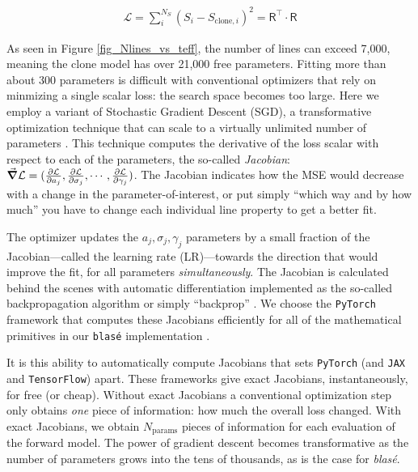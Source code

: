 \documentclass[twocolumn]{aastex631}
\begin{document}
\begin{eqnarray}
    \mathcal{L} = \sum_i^{N_S} (S_i - S_{\mathrm{clone},i})^2 = \mathsf{R^\intercal}\cdot \mathsf{R} \label{simpleLikelihood}
\end{eqnarray}


As seen in Figure \ref{fig_Nlines_vs_teff}, the number of lines can exceed 7,000, meaning the clone model has over 21,000 free parameters. Fitting more than about 300 parameters is difficult with conventional optimizers that rely on minmizing a single scalar loss: the search space becomes too large.  Here we employ a variant of Stochastic Gradient Descent (SGD), a transformative optimization technique that can scale to a virtually unlimited number of parameters \citep{2016arXiv160904747R}. This technique computes the derivative of the loss scalar with respect to each of the parameters, the so-called \emph{Jacobian}: $\grad \mathcal{L} = (\frac{\partial \mathcal{L}}{\partial a_j}, \frac{\partial \mathcal{L}}{\partial \sigma_j}, \cdots, \frac{\partial \mathcal{L}}{\partial \gamma_j})$. The Jacobian indicates how the MSE would decrease with a change in the parameter-of-interest, or put simply ``which way and by how much'' you have to change each individual line property to get a better fit.

The optimizer updates the $a_j, \sigma_j, \gamma_j$ parameters by a small fraction of the Jacobian---called the learning rate (LR)---towards the direction that would improve the fit, for all parameters \emph{simultaneously}. The Jacobian is calculated behind the scenes with automatic differentiation implemented as the so-called backpropagation algorithm or simply ``backprop'' \citep{2015arXiv150205767G}. We choose the \texttt{PyTorch} framework that computes these Jacobians efficiently for all of the mathematical primitives in our \texttt{blas\'e} implementation \citep{2019arXiv191201703P}.

It is this ability to automatically compute Jacobians that sets \texttt{PyTorch} (and \texttt{JAX} and \texttt{TensorFlow}) apart.  These frameworks give exact Jacobians, instantaneously, for free (or cheap).  Without exact Jacobians a conventional optimization step only obtains \emph{one} piece of information: how much the overall loss changed.  With exact Jacobians, we obtain $N_\mathrm{params}$ pieces of information for each evaluation of the forward model.  The power of gradient descent becomes transformative as the number of parameters grows into the tens of thousands, as is the case for \emph{blas\'e}.
\end{document}
